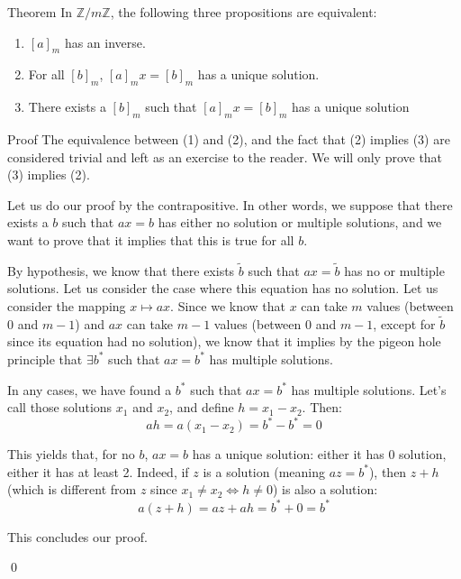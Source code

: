 \documentclass[a4paper]{article}
\begin{document}
\begin{parag}{Theorem}
    In $\mathbb{Z} / m\mathbb{Z}$, the following three propositions are equivalent:
    \begin{enumerate}
        \item $\left[a\right]_m$ has an inverse.
        \item For all $\left[b\right]_m$, $\left[a\right]_m x = \left[b\right]_m$ has a unique solution.
        \item There exists a $\left[b\right]_m$ such that $\left[a\right]_m x = \left[b\right]_m$ has a unique solution
    \end{enumerate}

    \begin{subparag}{Proof}
        The equivalence between (1) and (2), and the fact that (2) implies (3) are considered trivial and left as an exercise to the reader. We will only prove that (3) implies (2).

        Let us do our proof by the contrapositive. In other words, we suppose that there exists a $b$ such that $a x = b$ has either no solution or multiple solutions, and we want to prove that it implies that this is true for all $b$.

        By hypothesis, we know that there exists $\widetilde{b}$ such that $a x = \widetilde{b}$ has no or multiple solutions. Let us consider the case where this equation has no solution. Let us consider the mapping $x \mapsto a x$. Since we know that $x$ can take $m$ values (between $0$ and $m-1$) and $ax$ can take $m - 1$ values (between $0$ and $m-1$, except for $\widetilde{b}$ since its equation had no solution), we know that it implies by the pigeon hole principle that $\exists b^*$ such that $ax = b^*$ has multiple solutions.

        In any cases, we have found a $b^*$ such that $ax = b^*$ has multiple solutions. Let's call those solutions $x_1$ and $x_2$, and define $h = x_1 - x_2$. Then: 
        \[a h = a\left(x_1 - x_2\right) = b^* - b^* = 0\]

        This yields that, for no $b$, $ax = b$ has a unique solution: either it has 0 solution, either it has at least 2. Indeed, if $z$ is a solution (meaning $az = b^*$), then $z + h$ (which is different from $z$ since $x_1 \neq x_2 \iff h \neq 0$) is also a solution: 
        \[a\left(z + h\right) = az + ah = b^* + 0 = b^*\]
        
        This concludes our proof.

        \qed
    \end{subparag}
\end{parag}
\end{document}
